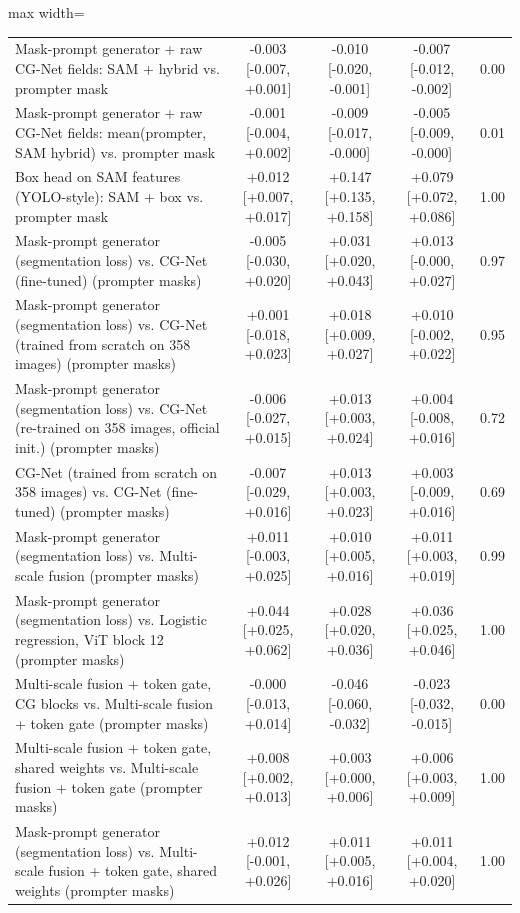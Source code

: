 \begin{table}[htbp]
\begin{adjustbox}{max width=\linewidth}
\begin{tabular}{lcccc}
Mask-prompt generator + raw CG-Net fields: SAM + hybrid vs. prompter mask & -0.003 [-0.007, +0.001] & -0.010 [-0.020, -0.001] & -0.007 [-0.012, -0.002] & 0.00 \\
Mask-prompt generator + raw CG-Net fields: mean(prompter, SAM hybrid) vs. prompter mask & -0.001 [-0.004, +0.002] & -0.009 [-0.017, -0.000] & -0.005 [-0.009, -0.000] & 0.01 \\
Box head on SAM features (YOLO-style): SAM + box vs. prompter mask & +0.012 [+0.007, +0.017] & +0.147 [+0.135, +0.158] & +0.079 [+0.072, +0.086] & 1.00 \\
Mask-prompt generator (segmentation loss) vs. CG-Net (fine-tuned) (prompter masks) & -0.005 [-0.030, +0.020] & +0.031 [+0.020, +0.043] & +0.013 [-0.000, +0.027] & 0.97 \\
Mask-prompt generator (segmentation loss) vs. CG-Net (trained from scratch on 358 images) (prompter masks) & +0.001 [-0.018, +0.023] & +0.018 [+0.009, +0.027] & +0.010 [-0.002, +0.022] & 0.95 \\
Mask-prompt generator (segmentation loss) vs. CG-Net (re-trained on 358 images, official init.) (prompter masks) & -0.006 [-0.027, +0.015] & +0.013 [+0.003, +0.024] & +0.004 [-0.008, +0.016] & 0.72 \\
CG-Net (trained from scratch on 358 images) vs. CG-Net (fine-tuned) (prompter masks) & -0.007 [-0.029, +0.016] & +0.013 [+0.003, +0.023] & +0.003 [-0.009, +0.016] & 0.69 \\
Mask-prompt generator (segmentation loss) vs. Multi-scale fusion (prompter masks) & +0.011 [-0.003, +0.025] & +0.010 [+0.005, +0.016] & +0.011 [+0.003, +0.019] & 0.99 \\
Mask-prompt generator (segmentation loss) vs. Logistic regression, ViT block 12 (prompter masks) & +0.044 [+0.025, +0.062] & +0.028 [+0.020, +0.036] & +0.036 [+0.025, +0.046] & 1.00 \\
Multi-scale fusion + token gate, CG blocks vs. Multi-scale fusion + token gate (prompter masks) & -0.000 [-0.013, +0.014] & -0.046 [-0.060, -0.032] & -0.023 [-0.032, -0.015] & 0.00 \\
Multi-scale fusion + token gate, shared weights vs. Multi-scale fusion + token gate (prompter masks) & +0.008 [+0.002, +0.013] & +0.003 [+0.000, +0.006] & +0.006 [+0.003, +0.009] & 1.00 \\
Mask-prompt generator (segmentation loss) vs. Multi-scale fusion + token gate, shared weights (prompter masks) & +0.012 [-0.001, +0.026] & +0.011 [+0.005, +0.016] & +0.011 [+0.004, +0.020] & 1.00 \\

\end{tabular}
\end{adjustbox}
\end{table}
